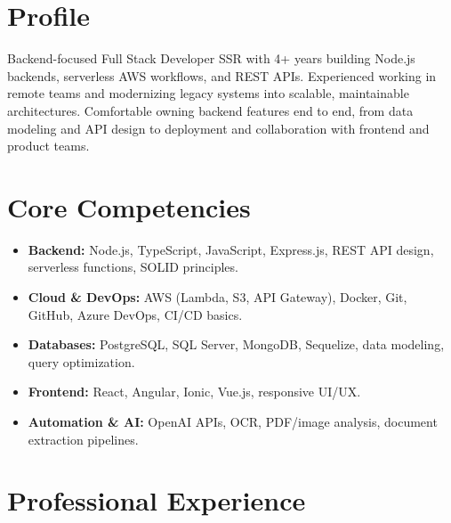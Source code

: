 \documentclass[11pt,a4paper,sans]{moderncv}
\begin{document}
\makecvtitle

\vspace{-4pt}

\section{Profile}
\vspace{1pt}
Backend-focused Full Stack Developer SSR with 4+ years building Node.js backends, serverless AWS workflows, and REST APIs. Experienced working in remote teams and modernizing legacy systems into scalable, maintainable architectures. Comfortable owning backend features end to end, from data modeling and API design to deployment and collaboration with frontend and product teams.

\section{Core Competencies}
\vspace{1pt}
\begin{itemize}
\item \textbf{Backend:} Node.js, TypeScript, JavaScript, Express.js, REST API design, serverless functions, SOLID principles.
\item \textbf{Cloud \& DevOps:} AWS (Lambda, S3, API Gateway), Docker, Git, GitHub, Azure DevOps, CI/CD basics.
\item \textbf{Databases:} PostgreSQL, SQL Server, MongoDB, Sequelize, data modeling, query optimization.
\item \textbf{Frontend:} React, Angular, Ionic, Vue.js, responsive UI/UX.
\item \textbf{Automation \& AI:} OpenAI APIs, OCR, PDF/image analysis, document extraction pipelines.
\end{itemize}

\section{Professional Experience}
\vspace{1pt}
\end{document}
